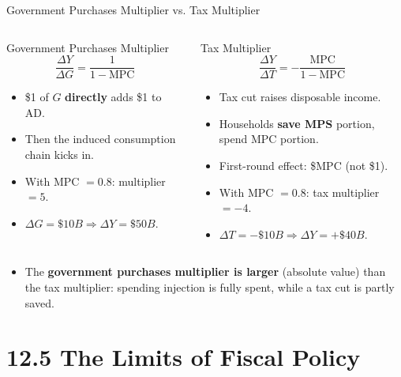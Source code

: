 \documentclass[aspectratio=169]{beamer}
\begin{document}
\begin{frame}{Government Purchases Multiplier vs. Tax Multiplier}
\transfade
\begin{columns}
\begin{block}{\textcolor{accent}{Government Purchases Multiplier}}
\[
  \frac{\Delta Y}{\Delta G} = \frac{1}{1-\text{MPC}}
\]
\begin{itemize}
  \item \$1 of $G$ \textbf{directly} adds \$1 to AD.
  \item Then the induced consumption chain kicks in.
  \item With MPC $= 0.8$: multiplier $= 5$.
  \item $\Delta G = \$10B \Rightarrow \Delta Y = \$50B$.
\end{itemize}
\end{block}
\begin{block}{\textcolor{canadared}{Tax Multiplier}}
\[
  \frac{\Delta Y}{\Delta T} = -\frac{\text{MPC}}{1-\text{MPC}}
\]
\begin{itemize}
  \item Tax cut raises disposable income.
  \item Households \textbf{save MPS} portion, spend MPC portion.
  \item First-round effect: \$MPC (not \$1).
  \item With MPC $= 0.8$: tax multiplier $= -4$.
  \item $\Delta T = -\$10B \Rightarrow \Delta Y = +\$40B$.
\end{itemize}
\end{block}
\end{columns}
\vspace{0.4em}
\begin{itemize}
  \item The \textbf{government purchases multiplier is larger} (absolute value) than the tax multiplier: spending injection is fully spent, while a tax cut is partly saved.
\end{itemize}
\end{frame}

\section{12.5 The Limits of Fiscal Policy}
\end{document}
